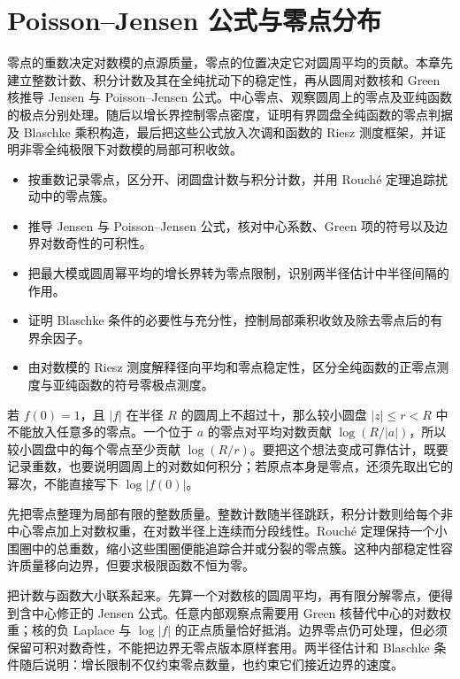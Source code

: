 \chapter{Poisson–Jensen 公式与零点分布}
\label{b3:ch:18}
\begin{chapterabstract}
零点的重数决定对数模的点源质量，零点的位置决定它对圆周平均的贡献。本章先建立整数计数、积分计数及其在全纯扰动下的稳定性，再从圆周对数核和 Green 核推导 Jensen 与 Poisson--Jensen 公式。中心零点、观察圆周上的零点及亚纯函数的极点分别处理。随后以增长界控制零点密度，证明有界圆盘全纯函数的零点判据及 Blaschke 乘积构造，最后把这些公式放入次调和函数的 Riesz 测度框架，并证明非零全纯极限下对数模的局部可积收敛。
\end{chapterabstract}

\begin{learninggoals}
\begin{itemize}
\item 按重数记录零点，区分开、闭圆盘计数与积分计数，并用 Rouch\'e 定理追踪扰动中的零点簇。
\item 推导 Jensen 与 Poisson--Jensen 公式，核对中心系数、Green 项的符号以及边界对数奇性的可积性。
\item 把最大模或圆周幂平均的增长界转为零点限制，识别两半径估计中半径间隔的作用。
\item 证明 Blaschke 条件的必要性与充分性，控制局部乘积收敛及除去零点后的有界余因子。
\item 由对数模的 Riesz 测度解释径向平均和零点稳定性，区分全纯函数的正零点测度与亚纯函数的符号零极点测度。
\end{itemize}
\end{learninggoals}

若 \(f(0)=1\)，且 \(|f|\) 在半径 \(R\) 的圆周上不超过十，那么较小圆盘 \(|z|\le r<R\) 中不能放入任意多的零点。一个位于 \(a\) 的零点对平均对数贡献 \(\log(R/|a|)\)，所以较小圆盘中的每个零点至少贡献 \(\log(R/r)\)。要把这个想法变成可靠估计，既要记录重数，也要说明圆周上的对数如何积分；若原点本身是零点，还须先取出它的幂次，不能直接写下 \(\log|f(0)|\)。

\ProseParagraphBreak
{}先把零点整理为局部有限的整数质量。整数计数随半径跳跃，积分计数则给每个非中心零点加上对数权重，在对数半径上连续而分段线性。Rouch\'e 定理保持一个小围圈中的总重数，缩小这些围圈便能追踪合并或分裂的零点簇。这种内部稳定性容许质量移向边界，但要求极限函数不恒为零。

\ProseParagraphBreak
{}把计数与函数大小联系起来。先算一个对数核的圆周平均，再有限分解零点，便得到含中心修正的 Jensen 公式。任意内部观察点需要用 Green 核替代中心的对数权重；核的负 Laplace 与 \(\log|f|\) 的正点质量恰好抵消。边界零点仍可处理，但必须保留可积对数奇性，不能把边界无零点版本原样套用。两半径估计和 Blaschke 条件随后说明：增长限制不仅约束零点数量，也约束它们接近边界的速度。

